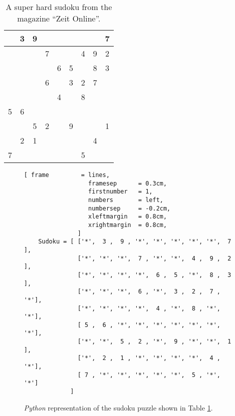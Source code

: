\begin{table}[h]
  \centering
  \begin{tabular}{||c|c|c||c|c|c||c|c|c||}
    \hline
    \hline
      & 3 & 9 &   &   &   &   &   & 7 \\
    \hline
      &   &   & 7 &   &   & 4 & 9 & 2 \\
    \hline
      &   &   &   & 6 & 5 &   & 8 & 3 \\
    \hline
    \hline
      &   &   & 6 &   & 3 & 2 & 7 &   \\
    \hline
      &   &   &   & 4 &   & 8 &   &   \\
    \hline
    5 & 6 &   &   &   &   &   &   &   \\
    \hline
    \hline
      &   & 5 & 2 &   & 9 &   &   & 1 \\
    \hline
      & 2 & 1 &   &   &   &   & 4 &   \\
    \hline
    7 &   &   &   &   &   & 5 &   &   \\
    \hline
    \hline
  \end{tabular}
  \caption{A super hard sudoku from the magazine ``Zeit Online''.}
  \label{tab:sudoku}
\end{table}

\begin{figure}[!ht]
\centering
\begin{Verbatim}[ frame         = lines, 
                  framesep      = 0.3cm, 
                  firstnumber   = 1,
                  numbers       = left,
                  numbersep     = -0.2cm,
                  xleftmargin   = 0.8cm,
                  xrightmargin  = 0.8cm,
               ]
    Sudoku = [ ['*',  3 ,  9 , '*', '*', '*', '*', '*',  7 ], 
               ['*', '*', '*',  7 , '*', '*',  4 ,  9 ,  2 ],
               ['*', '*', '*', '*',  6 ,  5 , '*',  8 ,  3 ],
               ['*', '*', '*',  6 , '*',  3 ,  2 ,  7 , '*'],
               ['*', '*', '*', '*',  4 , '*',  8 , '*', '*'],
               [ 5 ,  6 , '*', '*', '*', '*', '*', '*', '*'],
               ['*', '*',  5 ,  2 , '*',  9 , '*', '*',  1 ],
               ['*',  2 ,  1 , '*', '*', '*', '*',  4 , '*'],
               [ 7 , '*', '*', '*', '*', '*',  5 , '*', '*']
             ]
\end{Verbatim}
\vspace*{-0.3cm}
\caption{\textsl{Python} representation of the sudoku puzzle shown in Table \ref{tab:sudoku}.}
\label{fig:Sudoku.ipynb}
\end{figure}

